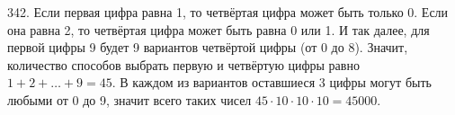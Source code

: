 342. Если первая цифра равна 1, то четвёртая цифра может быть только 0. Если она равна 2, то четвёртая цифра может быть равна 0 или 1. И так далее, для первой цифры 9 будет 9 вариантов четвёртой цифры (от 0 до 8). Значит, количество способов выбрать первую и четвёртую цифры равно $1+2+\ldots+9=45.$ В каждом из вариантов оставшиеся 3 цифры могут быть любыми от 0 до 9, значит всего таких чисел $45\cdot10\cdot10\cdot10=45000.$\newpage\noindent
